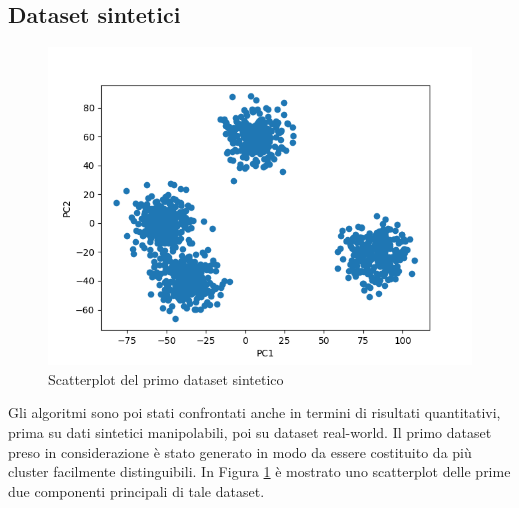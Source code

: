 \documentclass{article}
\begin{document}
\clearpage

    \subsection{Dataset sintetici}
    \begin{figure}
    \includegraphics[width=1\linewidth]{../results/plots/dataset1}
    \caption{Scatterplot del primo dataset sintetico}
    \label{fig:wrapfig1}
    \end{figure}

    Gli algoritmi sono poi stati confrontati anche in termini di risultati quantitativi, prima su dati sintetici manipolabili, poi su dataset real-world.
    Il primo dataset preso in considerazione è stato generato in modo da essere costituito da più cluster facilmente distinguibili. In Figura \ref{fig:wrapfig1} è mostrato uno scatterplot delle prime due componenti principali di tale dataset.
\end{document}
